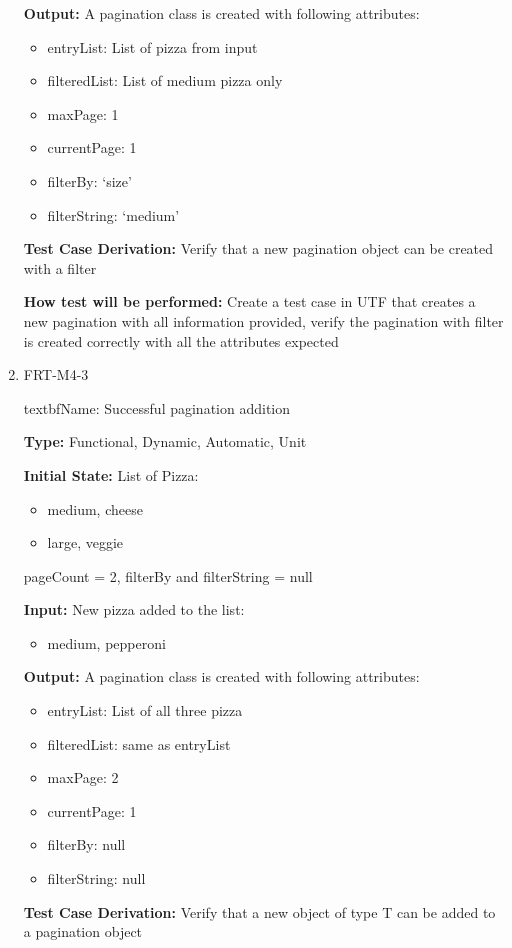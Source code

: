 \documentclass[12pt, titlepage]{article}
\begin{document}
\begin{enumerate}
\textbf{Output:} A pagination class is created with following attributes:
\begin{itemize}
\item entryList: List of pizza from input
\item filteredList: List of medium pizza only
\item maxPage: 1
\item currentPage: 1
\item filterBy: `size'
\item filterString: `medium'
\end{itemize}

\textbf{Test Case Derivation:} Verify that a new pagination object can be created with a filter

\textbf{How test will be performed:} Create a test case in UTF that creates a new pagination with all information provided, verify the pagination with filter is created correctly with all the attributes expected

\item{FRT-M4-3}

textbf{Name:} Successful pagination addition 

\textbf{Type:} Functional, Dynamic, Automatic, Unit
					
\textbf{Initial State:} List of Pizza:
\begin{itemize}
\item medium, cheese
\item large, veggie
\end{itemize}
pageCount = 2, filterBy and filterString = null
					
\textbf{Input:} New pizza added to the list:
\begin{itemize}
\item medium, pepperoni
\end{itemize}
					
\textbf{Output:} A pagination class is created with following attributes:
\begin{itemize}
\item entryList: List of all three pizza
\item filteredList: same as entryList
\item maxPage: 2
\item currentPage: 1
\item filterBy: null
\item filterString: null
\end{itemize}

\textbf{Test Case Derivation:} Verify that a new object of type T can be added to a pagination object


\end{enumerate}
\end{document}
